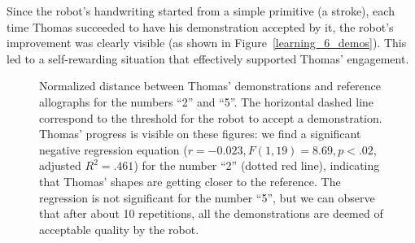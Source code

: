 \documentclass{article}
\begin{document}
Since the robot's handwriting started from a simple primitive (a stroke), each
time Thomas succeeded to have his demonstration accepted by it, the robot's
improvement was clearly visible (as shown in Figure~\ref{learning_6_demos}).
This led to a self-rewarding situation that effectively supported Thomas'
engagement.

\begin{figure}
    \centering
    \caption{\small Normalized distance between Thomas' demonstrations and
        reference allographs for the numbers ``2'' and ``5''. The horizontal
        dashed line correspond to the threshold for the robot to accept a
        demonstration. Thomas' progress is visible on these figures: we find a
        significant negative regression equation ($r=-0.023, F(1,19)=8.69,
        p<.02$, adjusted $R^2=.461$) for the number ``2'' (dotted red line),
        indicating that Thomas' shapes are getting closer to the reference. The
        regression is not significant for the number ``5'', but we can observe
        that after about 10 repetitions, all the demonstrations are deemed of
        acceptable quality by the robot.  }

    \label{Thomas_progress}
\end{figure}

\end{document}
